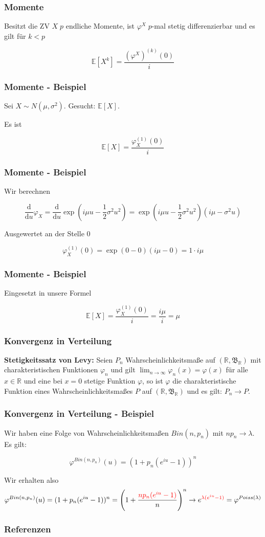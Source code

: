 \documentclass{beamer}
\newcommand{\R}{\mathbb{R}}
\newcommand{\E}{\mathbb{E}}
\newcommand\dint{\mathord{\mathrm{d}}}
\begin{document}
\begin{frame}
\frametitle{Momente}
Besitzt die ZV $X \; p$ endliche Momente, ist $\varphi^X \; p$-mal stetig differenzierbar und es gilt für $k < p$

\begin{equation*}
\E[X^k] = \frac{(\varphi^X)^{(k)}(0)}{i}
\end{equation*}
\end{frame}

\begin{frame}
\frametitle{Momente - Beispiel}
Sei $X \sim N(\mu, \sigma^2)$. Gesucht: $\E[X]$.

Es ist

$$\E[X] = \frac{\varphi_X^{(1)}(0)}{i}$$
\end{frame}

\begin{frame}
\frametitle{Momente - Beispiel}
Wir berechnen

$$\frac{\dint}{\dint u} \varphi_X = \frac{\dint}{\dint u} \exp(i \mu u - \frac{1}{2} \sigma^2 u^2) = \exp(i \mu u - \frac{1}{2} \sigma^2 u^2) (i \mu - \sigma^2 u)$$

Ausgewertet an der Stelle 0

$$\varphi_X^{(1)}(0) = \exp(0 - 0) (i \mu - 0) = 1 \cdot i \mu$$
\end{frame}

\begin{frame}
\frametitle{Momente - Beispiel}
Eingesetzt in unsere Formel

$$\E[X] = \frac{\varphi_X^{(1)}(0)}{i} = \frac{i \mu}{i} = \mu$$
\end{frame}

\begin{frame}
\frametitle{Konvergenz in Verteilung}
\textbf{Stetigkeitssatz von Levy:} \hfill \newline
Seien $P_n$ Wahrscheinlichkeitsmaße auf $(\R, \mathfrak{B}_\R)$ mit charakteristischen Funktionen $\varphi_n$ und gilt $\lim_{n \to \infty} \varphi_n (x) = \varphi(x)$ für alle $x \in \R$ und eine bei $x = 0$ stetige Funktion $\varphi$, so ist $\varphi$ die charakteristische Funktion eines Wahrscheinlichkeitsmaßes $P$ auf $(\R, \mathfrak{B}_\R)$ und es gilt: $P_n \to P$.
\end{frame}

\begin{frame}
\frametitle{Konvergenz in Verteilung - Beispiel}
Wir haben eine Folge von Wahrscheinlichkeitsmaßen $Bin(n, p_n)$ mit $np_n \to \lambda$. Es gilt:

$$\varphi^{Bin(n, p_n)}(u) = (1 + p_n(e^{iu} - 1))^n$$

Wir erhalten also
{\footnotesize
$$\varphi^{Bin(n, p_n)}(u) = (1 + p_n(e^{iu} - 1))^n = \Bigg(1 + \frac{\textcolor{red}{np_n(e^{iu} - 1)}}{n}\Bigg)^n \to e^{\textcolor{red}{\lambda(e^{iu}-1)}} = \varphi^{Poiss(\lambda)}$$
}%
\end{frame}


\begin{frame}
\frametitle{Referenzen}
\nocite{*}
\printbibliography
\end{frame}
\end{document}
